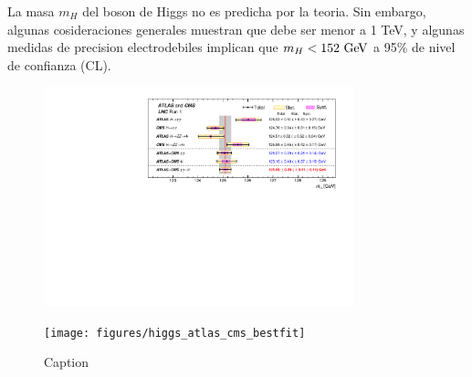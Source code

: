 La masa $m_H$ del boson de Higgs no es predicha por la teoria. Sin embargo,
algunas cosideraciones generales muestran que debe ser menor a 1 TeV, y
algunas medidas de precision electrodebiles implican que $m_H < 152 \gev$ a
95\% de nivel de confianza (CL).

\begin{figure}[!ht]
  \centering
  \includegraphics[width=0.8\textwidth]{figures/higgs_atlas_cms_mass}

  \texttt{[image: figures/higgs\_atlas\_cms\_bestfit]}
  \caption{Caption}
  \label{fig:higgs_cms_atlas}
\end{figure}







